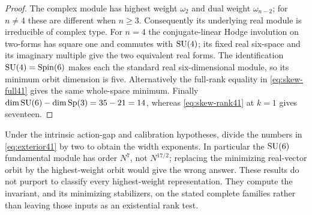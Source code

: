 \begin{proof}
The complex module has highest weight $\omega_2$ and dual weight
$\omega_{n-2}$; for $n\ne4$ these are different when $n\ge3$.
Consequently its underlying real module is irreducible of complex type.
For $n=4$ the conjugate-linear Hodge involution on two-forms has square
one and commutes with $\operatorname{SU}(4)$; its fixed real six-space and its
imaginary multiple give the two equivalent real forms. The identification
$\operatorname{SU}(4)=\operatorname{Spin}(6)$ makes each the standard real
six-dimensional module, so its minimum orbit dimension is five.
Alternatively the full-rank equality in \eqref{eq:skew-full41} gives
the same whole-space minimum. Finally $\dim\operatorname{SU}(6)-\dim\operatorname{Sp}(3)
=35-21=14$, whereas \eqref{eq:skew-rank41} at $k=1$ gives seventeen.
\end{proof}

Under the intrinsic action-gap and calibration hypotheses, divide the
numbers in \eqref{eq:exterior41} by two to obtain the width exponents.
In particular the $\operatorname{SU}(6)$ fundamental module has order $N^7$, not
$N^{17/2}$; replacing the minimizing real-vector orbit by the
highest-weight orbit would give the wrong answer. These results do not
purport to classify every highest-weight representation. They compute
the invariant, and its minimizing stabilizers, on the stated complete
families rather than leaving those inputs as an existential rank test.
